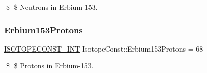 \$ \$ Neutrons in Erbium-\/153. \mbox{\label{group___isotope_const-_erbium-_er153_ga8087419cfd653dc0ebc240c2b897f80a}} 
\subsubsection{\texorpdfstring{Erbium153\+Protons}{Erbium153Protons}}
{\footnotesize\ttfamily \mbox{\hyperlink{group___isotope_const-_macros_ga5f18360b3e99483a35c32d789e62621c}{I\+S\+O\+T\+O\+P\+E\+C\+O\+N\+S\+T\+\_\+\+I\+NT}} Isotope\+Const\+::\+Erbium153\+Protons = 68}

\$ \$ Protons in Erbium-\/153. 